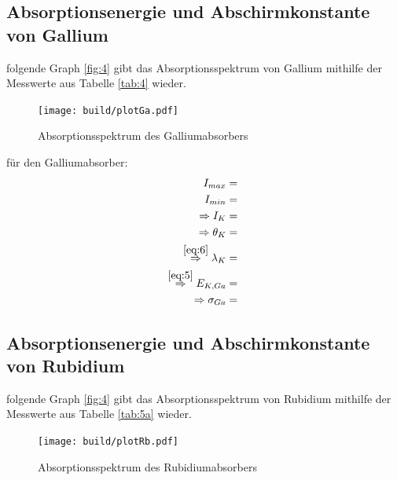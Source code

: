 \subsection{Absorptionsenergie und Abschirmkonstante von Gallium}

    \justifying folgende Graph \ref{fig:4} gibt das Absorptionsspektrum von Gallium mithilfe der Messwerte aus Tabelle \ref{tab:4} 
    wieder.

    \begin{figure}[H]
        \centering
        \texttt{[image: build/plotGa.pdf]}
        \caption{Absorptionsspektrum des Galliumabsorbers}
        \label{fig:5}
    \end{figure}

    \justifying für den Galliumabsorber:
    \begin{subequations}\label{eq:22}
    \begin{align}
        I_{max} &= \text{} \label{eq:22a}\\
        I_{min} &= \text{} \label{eq:22b}\\
        \Rightarrow I_K &= \text{} \label{eq:22c}\\
        \Rightarrow \theta_K &= \text{} \label{eq:22d}\\
        \stackrel{\eqref{eq:6}}{\Rightarrow} \lambda_K &= \text{} \label{eq:22e}\\
        \stackrel{\eqref{eq:5}}{\Rightarrow} E_{K,Ga} &= \text{} \label{eq:22f}\\
        \Rightarrow \sigma_{Ga} &= \text{} \label{eq:22g}
    \end{align}
    \end{subequations}

\subsection{Absorptionsenergie und Abschirmkonstante von Rubidium}

    \justifying folgende Graph \ref{fig:4} gibt das Absorptionsspektrum von Rubidium mithilfe der Messwerte aus Tabelle \ref{tab:5a} 
    wieder.

    \begin{figure}[H]
        \centering
        \texttt{[image: build/plotRb.pdf]}
        \caption{Absorptionsspektrum des Rubidiumabsorbers}
        \label{fig:6}
    \end{figure}

